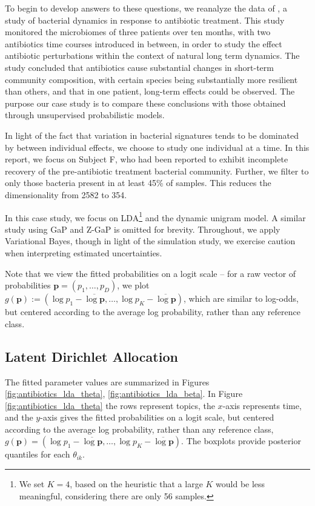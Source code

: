 \documentclass[oupdraft]{bio}
\begin{document}
To begin to develop answers to these questions, we reanalyze the data of
\citep{dethlefsen2011incomplete}, a study of bacterial dynamics in response to
antibiotic treatment. This study monitored the microbiomes of three patients
over ten months, with two antibiotics time courses introduced in between, in
order to study the effect antibiotic perturbations within the context of
natural long term dynamics. The study concluded that antibiotics cause
substantial changes in short-term community composition, with certain species
being substantially more resilient than others, and that in one patient,
long-term effects could be observed. The purpose our case study is to compare
these conclusions with those obtained through unsupervised probabilistic models.

In light of the fact that variation in bacterial signatures tends to be
dominated by between individual effects, we choose to study one individual at a
time. In this report, we focus on Subject F, who had been reported to exhibit
incomplete recovery of the pre-antibiotic treatment bacterial community. Further, we
filter to only those bacteria present in at least 45\% of samples. This reduces
the dimensionality from 2582 to 354.

In this case study, we focus on LDA\footnote{We set $K = 4$, based on the
  heuristic that a large $K$ would be less meaningful, considering there are
  only 56 samples.} and the dynamic unigram model. A similar study using GaP and
Z-GaP is omitted for brevity. Throughout, we apply Variational Bayes, though in
light of the simulation study, we exercise caution when interpreting estimated
uncertainties.

Note that we view the fitted probabilities on a logit scale -- for a raw vector
of probabilities $\mathbf{p} = \left(p_{1}, \dots, p_{D}\right)$, we plot
$g\left(\mathbf{p}\right) := \left(\log p_{1} - \overline{\log \mathbf{p}}, \dots,
\log p_{K} - \overline{\log \mathbf{p}}\right)$, which are similar to log-odds,
but centered according to the average log probability, rather than any reference
class.

\subsection{Latent Dirichlet Allocation}
\label{sec:antibiotics_lda}

The fitted parameter values are summarized in Figures
\ref{fig:antibiotics_lda_theta}, \ref{fig:antibiotics_lda_beta}.
In Figure \ref{fig:antibiotics_lda_theta} the rows represent topics, the
$x$-axis represents time, and the $y$-axis gives the fitted probabilities on a
logit scale, but centered according to the average log probability, rather than
any reference class, $g\left(\mathbf{p}\right) = \left(\log p_{1} - \overline{\log
  \mathbf{p}}, \dots, \log p_{K} - \overline{\log \mathbf{p}}\right)$. The boxplots
provide posterior quantiles for each $\theta_{ik}$.
\end{document}
